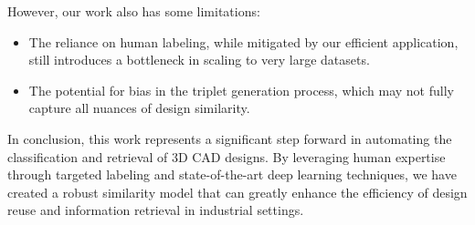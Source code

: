 However, our work also has some limitations:

\begin{itemize}
    \item The reliance on human labeling, while mitigated by our efficient application, still introduces a bottleneck in scaling to very large datasets.
    \item The potential for bias in the triplet generation process, which may not fully capture all nuances of design similarity.
\end{itemize}


In conclusion, this work represents a significant step forward in automating the classification and retrieval of 3D CAD designs. By leveraging human expertise through targeted labeling and state-of-the-art deep learning techniques, we have created a robust similarity model that can greatly enhance the efficiency of design reuse and information retrieval in industrial settings. 


